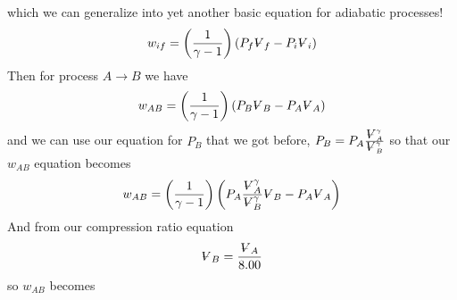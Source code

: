 \documentclass{article}
\begin{document}
which we can generalize into yet another basic equation for adiabatic
processes!%
\[
w_{if}=\left( \frac{1}{\gamma -1}\right) \left( P_{f}%
\ooalign{\hfil$V$\hfil\cr\kern0.1em--\hfil\cr}%
_{f}-P_{i}%
\ooalign{\hfil$V$\hfil\cr\kern0.1em--\hfil\cr}%
_{i}\right) 
\]%
Then for process $A\rightarrow B$ we have%
\[
w_{AB}=\left( \frac{1}{\gamma -1}\right) \left( P_{B}%
\ooalign{\hfil$V$\hfil\cr\kern0.1em--\hfil\cr}%
_{B}-P_{A}%
\ooalign{\hfil$V$\hfil\cr\kern0.1em--\hfil\cr}%
_{A}\right) 
\]%
and we can use our equation for $P_{B}$ that we got before, $P_{B}=P_{A}%
\frac{%
\ooalign{\hfil$V$\hfil\cr\kern0.1em--\hfil\cr}%
_{A}^{\gamma }}{%
\ooalign{\hfil$V$\hfil\cr\kern0.1em--\hfil\cr}%
_{B}^{\gamma }}$ so that our $w_{AB}$ equation becomes 
\[
w_{AB}=\left( \frac{1}{\gamma -1}\right) \left( P_{A}\frac{%
\ooalign{\hfil$V$\hfil\cr\kern0.1em--\hfil\cr}%
_{A}^{\gamma }}{%
\ooalign{\hfil$V$\hfil\cr\kern0.1em--\hfil\cr}%
_{B}^{\gamma }}%
\ooalign{\hfil$V$\hfil\cr\kern0.1em--\hfil\cr}%
_{B}-P_{A}%
\ooalign{\hfil$V$\hfil\cr\kern0.1em--\hfil\cr}%
_{A}\right) 
\]%
And from our compression ratio equation 
\[
\ooalign{\hfil$V$\hfil\cr\kern0.1em--\hfil\cr}%
_{B}=\frac{%
\ooalign{\hfil$V$\hfil\cr\kern0.1em--\hfil\cr}%
_{A}}{8.00} 
\]%
so $w_{AB}$ becomes 
\end{document}
